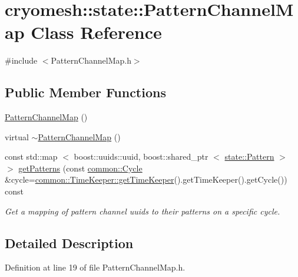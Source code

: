 \hypertarget{classcryomesh_1_1state_1_1PatternChannelMap}{\section{cryomesh\-:\-:state\-:\-:\-Pattern\-Channel\-Map \-Class \-Reference}
\label{classcryomesh_1_1state_1_1PatternChannelMap}
}


{\ttfamily \#include $<$\-Pattern\-Channel\-Map.\-h$>$}

\subsection*{\-Public \-Member \-Functions}
\begin{DoxyCompactItemize}
\item 
\hyperlink{classcryomesh_1_1state_1_1PatternChannelMap_ab86832e1eefc51d37bfa9064d00c544c}{\-Pattern\-Channel\-Map} ()
\item 
virtual \hyperlink{classcryomesh_1_1state_1_1PatternChannelMap_a9721f6381373178b4e1bb774381fb32d}{$\sim$\-Pattern\-Channel\-Map} ()
\item 
const std\-::map\*
$<$ boost\-::uuids\-::uuid, \*
boost\-::shared\-\_\-ptr\*
$<$ \hyperlink{classcryomesh_1_1state_1_1Pattern}{state\-::\-Pattern} $>$ $>$ \hyperlink{classcryomesh_1_1state_1_1PatternChannelMap_a342961ee8c4ab0cbd33cc40b2c5711b5}{get\-Patterns} (const \hyperlink{classcryomesh_1_1common_1_1Cycle}{common\-::\-Cycle} \&cycle=\hyperlink{classcryomesh_1_1common_1_1TimeKeeper_afe7b229532e11119cb2653192615d679}{common\-::\-Time\-Keeper\-::get\-Time\-Keeper}().get\-Time\-Keeper().get\-Cycle()) const 
\begin{DoxyCompactList}\small\item\em \-Get a mapping of pattern channel uuids to their patterns on a specific cycle. \end{DoxyCompactList}\end{DoxyCompactItemize}


\subsection{\-Detailed \-Description}


\-Definition at line 19 of file \-Pattern\-Channel\-Map.\-h.



